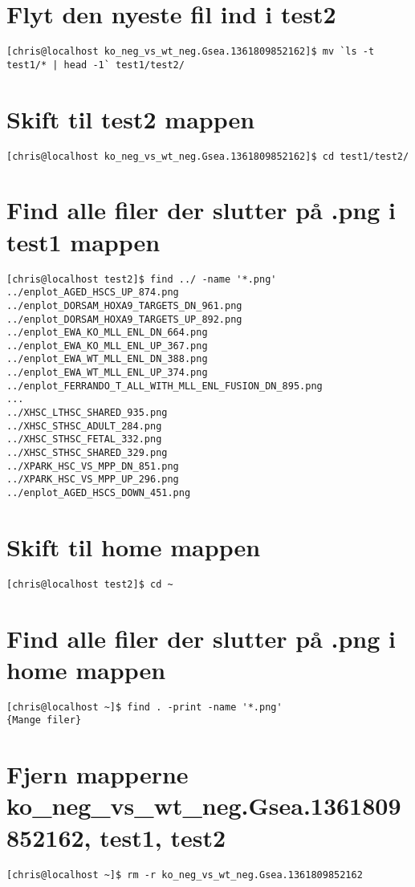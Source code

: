 \documentclass[12pt]{article}
\begin{document}
\section{Flyt den nyeste fil ind i test2}

\begin{lstlisting}
[chris@localhost ko_neg_vs_wt_neg.Gsea.1361809852162]$ mv `ls -t test1/* | head -1` test1/test2/
\end{lstlisting}

\section{Skift til test2 mappen}

\begin{lstlisting}
[chris@localhost ko_neg_vs_wt_neg.Gsea.1361809852162]$ cd test1/test2/
\end{lstlisting}

\section{Find alle filer der slutter på .png i test1 mappen}

\begin{lstlisting}
[chris@localhost test2]$ find ../ -name '*.png'
../enplot_AGED_HSCS_UP_874.png
../enplot_DORSAM_HOXA9_TARGETS_DN_961.png
../enplot_DORSAM_HOXA9_TARGETS_UP_892.png
../enplot_EWA_KO_MLL_ENL_DN_664.png
../enplot_EWA_KO_MLL_ENL_UP_367.png
../enplot_EWA_WT_MLL_ENL_DN_388.png
../enplot_EWA_WT_MLL_ENL_UP_374.png
../enplot_FERRANDO_T_ALL_WITH_MLL_ENL_FUSION_DN_895.png
...
../XHSC_LTHSC_SHARED_935.png
../XHSC_STHSC_ADULT_284.png
../XHSC_STHSC_FETAL_332.png
../XHSC_STHSC_SHARED_329.png
../XPARK_HSC_VS_MPP_DN_851.png
../XPARK_HSC_VS_MPP_UP_296.png
../enplot_AGED_HSCS_DOWN_451.png
\end{lstlisting}

\section{Skift til home mappen}

\begin{lstlisting}
[chris@localhost test2]$ cd ~
\end{lstlisting}

\section{Find alle filer der slutter på .png i home mappen}

\begin{lstlisting}
[chris@localhost ~]$ find . -print -name '*.png'
{Mange filer}
\end{lstlisting}

\section{Fjern mapperne ko\_neg\_vs\_wt\_neg.Gsea.1361809852162, test1, test2}

\begin{lstlisting}
[chris@localhost ~]$ rm -r ko_neg_vs_wt_neg.Gsea.1361809852162
\end{lstlisting}
\end{document}
